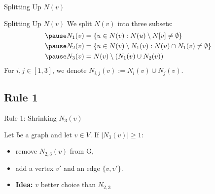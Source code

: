 \begin{frame}[c]{Splitting Up $N(v)$}
    \begin{figure}[!ht]
    \end{figure}
\end{frame}
\begin{frame}[c]{Splitting Up $N(v)$}
 We split $N(v)$ into three subsets:
    \begin{align}
       \pause N_1(v) & = \{u \in N(v) : N(u) \setminus N[v] \neq \emptyset \}              \\
        \pause N_2(v) & = \{u \in N(v)\setminus N_1(v) : N(u) \cap N_1(v) \neq \emptyset \} \\
        \pause N_3(v) & = N(v) \setminus (N_1(v) \cup N_2(v))
    \end{align}
    For $i,j \in [1,3]$, we denote $N_{i,j} (v) := N_i(v) \cup N_j(v)$. 
\end{frame}


\subsection{Rule 1}
\begin{frame}[c]{Rule 1: Shrinking $N_3(v)$}

    \begin{tcolorbox}[colback=TUMBlueLighter,title=]
        Let \G be a graph and let $v \in V$. If $|N_3(v)| \geq 1$:
        \begin{itemize}
            \item remove $N_{2,3}(v)$ from G,
            \item add a vertex $v'$ and an edge $\{v, v'\}$.
        \end{itemize}
    \end{tcolorbox}

    \begin{figure}[!ht]
    \end{figure}
    \begin{itemize}
        \item \textbf{Idea: } $v$ better choice than $N_{2,3}$
    \end{itemize}
\end{frame}

